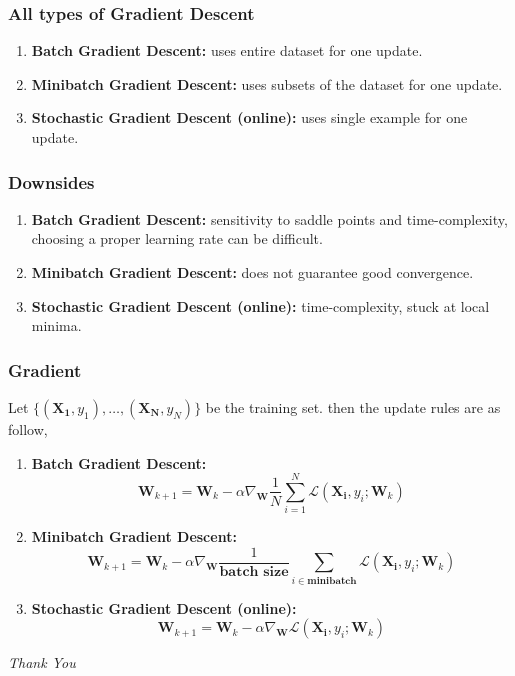 \documentclass[12pt,aspectratio=169]{beamer}
\begin{document}
\begin{frame}
\frametitle{All types of Gradient Descent}
\begin{enumerate}
\item \textbf{Batch Gradient Descent:} uses entire dataset for one update.
\bigskip
\item \textbf{Minibatch Gradient Descent:} uses subsets of the dataset for one update.
\bigskip 
\item \textbf{Stochastic Gradient Descent (online):} uses single example for one update.
\end{enumerate}
\end{frame}

\begin{frame}
\frametitle{Downsides}
\begin{enumerate}
\item \textbf{Batch Gradient Descent:} sensitivity to saddle points and time-complexity, choosing a proper learning rate can be difficult.
\bigskip
\item \textbf{Minibatch Gradient Descent:} does not guarantee good convergence.
\bigskip 
\item \textbf{Stochastic Gradient Descent (online):} time-complexity, stuck at local minima.
\end{enumerate}
\end{frame}


\begin{frame}
\frametitle{Gradient}
Let $\{(\mathbf{X_1},y_1),\dots,(\mathbf{X_N},y_N)\}$ be the training set. then the update rules are as follow,
\begin{enumerate}
\item \textbf{Batch Gradient Descent:} 
\[
\mathbf{W}_{k+1}=\mathbf{W}_k-\alpha\nabla_{\mathbf{W}} \frac{1}{N}\sum_{i=1}^N\mathcal{L}(\mathbf{X_i},y_i;\mathbf{W}_k)
\]
\item \textbf{Minibatch Gradient Descent:}
 \[
\mathbf{W}_{k+1}=\mathbf{W}_k-\alpha \nabla_{\mathbf{W}}\frac{1}{\textbf{batch size}}\sum_{i\in \textbf{minibatch}}\mathcal{L}(\mathbf{X_i},y_i;\mathbf{W}_k)
\]
\item \textbf{Stochastic Gradient Descent (online):} \[
\mathbf{W}_{k+1}=\mathbf{W}_k-\alpha\nabla_{\mathbf{W}}\mathcal{L}(\mathbf{X_i},y_i;\mathbf{W}_k)
\]
\end{enumerate}
\end{frame}


\begin{frame}{}
  \centering \Huge
  \emph{Thank You}
\end{frame}
\end{document}
